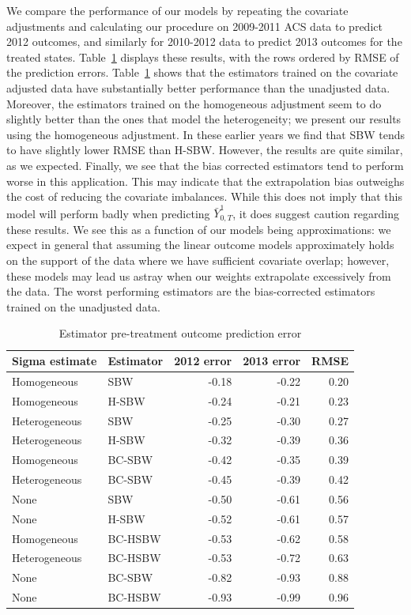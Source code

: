 \documentclass[aoas]{imsart}
\theoremstyle{plain}
\theoremstyle{remark}
\begin{document}
We compare the performance of our models by repeating the covariate adjustments and calculating our procedure on 2009-2011 ACS data to predict 2012 outcomes, and similarly for 2010-2012 data to predict 2013 outcomes for the treated states. Table~\ref{tab:pretxpred} displays these results, with the rows ordered by RMSE of the prediction errors. Table~\ref{tab:pretxpred} shows that the estimators trained on the covariate adjusted data have substantially better performance than the unadjusted data. Moreover, the estimators trained on the homogeneous adjustment seem to do slightly better than the ones that model the heterogeneity; we present our results using the homogeneous adjustment. In these earlier years we find that SBW tends to have slightly lower RMSE than H-SBW. However, the results are quite similar, as we expected. Finally, we see that the bias corrected estimators tend to perform worse in this application. This may indicate that the extrapolation bias outweighs the cost of reducing the covariate imbalances. While this does not imply that this model will perform badly when predicting $\bar{Y}^1_{0, T}$, it does suggest caution regarding these results. We see this as a function of our models being approximations: we expect in general that assuming the linear outcome models approximately holds on the support of the data where we have sufficient covariate overlap; however, these models may lead us astray when our weights extrapolate excessively from the data. The worst performing estimators are the bias-corrected estimators trained on the unadjusted data.

\begin{table}[ht]
\caption{Estimator pre-treatment outcome prediction error}
\label{tab:pretxpred}
\begin{tabular}{llrrr}
  \hline
Sigma estimate & Estimator & 2012 error & 2013 error & RMSE \\ 
  \hline
Homogeneous & SBW & -0.18 & -0.22 & 0.20 \\ 
  Homogeneous & H-SBW & -0.24 & -0.21 & 0.23 \\ 
  Heterogeneous & SBW & -0.25 & -0.30 & 0.27 \\ 
  Heterogeneous & H-SBW & -0.32 & -0.39 & 0.36 \\ 
  Homogeneous & BC-SBW & -0.42 & -0.35 & 0.39 \\ 
  Heterogeneous & BC-SBW & -0.45 & -0.39 & 0.42 \\ 
  None & SBW & -0.50 & -0.61 & 0.56 \\ 
  None & H-SBW & -0.52 & -0.61 & 0.57 \\ 
  Homogeneous & BC-HSBW & -0.53 & -0.62 & 0.58 \\ 
  Heterogeneous & BC-HSBW & -0.53 & -0.72 & 0.63 \\ 
  None & BC-SBW & -0.82 & -0.93 & 0.88 \\ 
  None & BC-HSBW & -0.93 & -0.99 & 0.96 \\ 
   \hline
\end{tabular}
\end{table}
\end{document}
